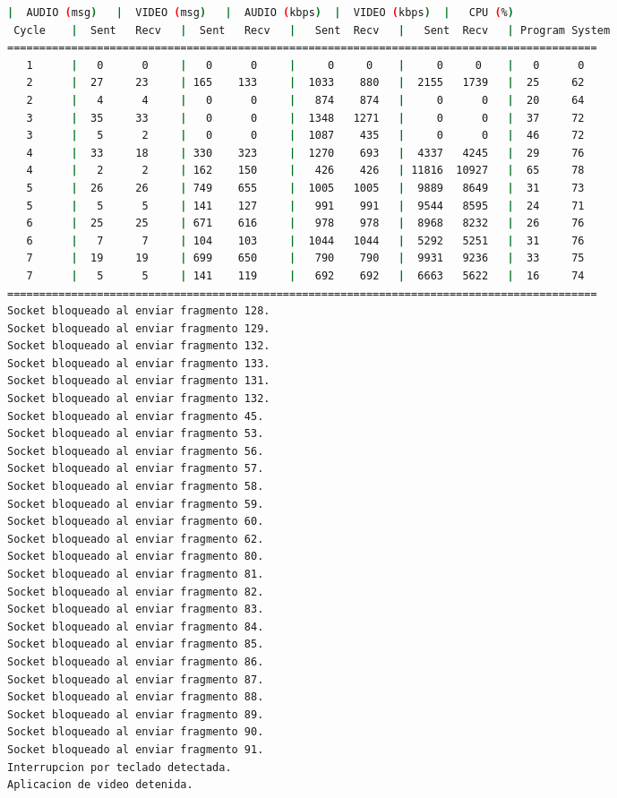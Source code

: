\begin{adjustbox}{max width=\textwidth}
\begin{lstlisting}[language=bash,basicstyle=\ttfamily\scriptsize]
          |  AUDIO (msg)   |  VIDEO (msg)   |  AUDIO (kbps)  |  VIDEO (kbps)  |   CPU (%)
 Cycle    |  Sent   Recv   |  Sent   Recv   |   Sent  Recv   |   Sent  Recv   | Program System
============================================================================================
   1      |   0      0     |   0      0     |     0     0    |     0     0    |   0      0
   2      |  27     23     | 165    133     |  1033    880   |  2155   1739   |  25     62
   2      |   4      4     |   0      0     |   874    874   |     0      0   |  20     64
   3      |  35     33     |   0      0     |  1348   1271   |     0      0   |  37     72
   3      |   5      2     |   0      0     |  1087    435   |     0      0   |  46     72
   4      |  33     18     | 330    323     |  1270    693   |  4337   4245   |  29     76
   4      |   2      2     | 162    150     |   426    426   | 11816  10927   |  65     78
   5      |  26     26     | 749    655     |  1005   1005   |  9889   8649   |  31     73
   5      |   5      5     | 141    127     |   991    991   |  9544   8595   |  24     71
   6      |  25     25     | 671    616     |   978    978   |  8968   8232   |  26     76
   6      |   7      7     | 104    103     |  1044   1044   |  5292   5251   |  31     76
   7      |  19     19     | 699    650     |   790    790   |  9931   9236   |  33     75
   7      |   5      5     | 141    119     |   692    692   |  6663   5622   |  16     74
============================================================================================
Socket bloqueado al enviar fragmento 128.
Socket bloqueado al enviar fragmento 129.
Socket bloqueado al enviar fragmento 132.
Socket bloqueado al enviar fragmento 133.
Socket bloqueado al enviar fragmento 131.
Socket bloqueado al enviar fragmento 132.
Socket bloqueado al enviar fragmento 45.
Socket bloqueado al enviar fragmento 53.
Socket bloqueado al enviar fragmento 56.
Socket bloqueado al enviar fragmento 57.
Socket bloqueado al enviar fragmento 58.
Socket bloqueado al enviar fragmento 59.
Socket bloqueado al enviar fragmento 60.
Socket bloqueado al enviar fragmento 62.
Socket bloqueado al enviar fragmento 80.
Socket bloqueado al enviar fragmento 81.
Socket bloqueado al enviar fragmento 82.
Socket bloqueado al enviar fragmento 83.
Socket bloqueado al enviar fragmento 84.
Socket bloqueado al enviar fragmento 85.
Socket bloqueado al enviar fragmento 86.
Socket bloqueado al enviar fragmento 87.
Socket bloqueado al enviar fragmento 88.
Socket bloqueado al enviar fragmento 89.
Socket bloqueado al enviar fragmento 90.
Socket bloqueado al enviar fragmento 91.
Interrupcion por teclado detectada.
Aplicacion de video detenida.


\end{lstlisting}
\end{adjustbox}
